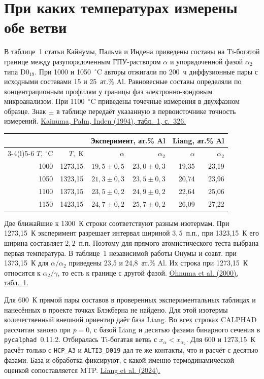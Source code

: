 \section*{При каких температурах измерены обе ветви}
В таблице~1 статьи Кайнумы, Пальма и Индена приведены составы на
Ti-богатой границе между разупорядоченным ГПУ-раствором \(\alpha\) и
упорядоченной фазой \(\alpha_2\) типа D0$_{19}$.
При 1000 и 1050~\(^\circ\)C авторы отжигали по 200~ч диффузионные пары
с исходными составами 15 и 25~ат.\% Al. Равновесные составы определяли
по концентрационным профилям у границы фаз электронно-зондовым
микроанализом. При 1100~\(^\circ\)C приведены точечные измерения в
двухфазном образце. Знак \(\pm\) в таблице передаёт указанную в
первоисточнике точность измерений.
\href{https://doi.org/10.1016/0966-9795(94)90018-3}{Kainuma, Palm, Inden (1994), табл.~1, с.~326.}

\begin{center}\small
\begin{tabular}{@{}rrrrrr@{}}
\toprule
&&\multicolumn{2}{c}{Эксперимент, ат.\% Al}&
\multicolumn{2}{c}{Liang, ат.\% Al}\\
\cmidrule(lr){3-4}\cmidrule(l){5-6}
\(T,\ ^\circ\)C & \(T,\) К & \(\alpha\) & \(\alpha_2\) & \(\alpha\) & \(\alpha_2\)\\
\midrule
1000 & 1273,15 & \(19{,}5\pm0{,}5\) & \(23{,}0\pm0{,}3\) & 19,35 & 23,19\\
1050 & 1323,15 & \(21{,}3\pm0{,}3\) & \(23{,}5\pm0{,}3\) & 20,74 & 23,96\\
1100 & 1373,15 & \(23{,}5\pm0{,}2\) & \(24{,}9\pm0{,}2\) & 22,64 & 25,06\\
1150 & 1423,15 & \(24{,}7\pm0{,}2\) & \(25{,}7\pm0{,}2\) & 26,09 & 27,22\\
\bottomrule
\end{tabular}
\end{center}
Две ближайшие к 1300~К строки соответствуют разным изотермам. При
1273,15~К эксперимент разрешает интервал шириной \(3{,}5\)~п.п., при
1323,15~К его ширина составляет \(2{,}2\)~п.п. Поэтому для прямого
атомистического теста выбрана первая температура. В таблице~1 независимой
работы Онумы и соавт. при 1373,15~К для \(\alpha/\alpha_2\) приведены
23,5 и 24,8~ат.\% Al. Их строка при 1273,15~К относится к
\(\alpha_2/\gamma\), то есть к границе с другой фазой.
\href{https://doi.org/10.1016/S1359-6454(00)00118-X}{Ohnuma et al. (2000), табл.~1.}

Для 600~К прямой пары составов в проверенных экспериментальных
таблицах и нанесённых в проекте точках Блэкберна не найдено.
Для этой изотермы количественный внешний ориентир даёт база Liang.
Во всех строках CALPHAD рассчитан заново при \(p=0\), с базой Liang
и десятью фазами бинарного сечения в \texttt{pycalphad}~0.11.2.
Отбиралась Ti-богатая ветвь с \(x_\alpha<x_{\alpha_2}\).
Для 600 и 1273,15~К расчёт только с \texttt{HCP\_A3} и
\texttt{ALTI3\_D019} дал те же контакты, что и расчёт с десятью фазами.
База и обработка фиксируют, с какой именно термодинамической оценкой
сопоставляется MTP. \href{https://doi.org/10.1007/s11669-024-01124-9}{Liang et al. (2024).}
